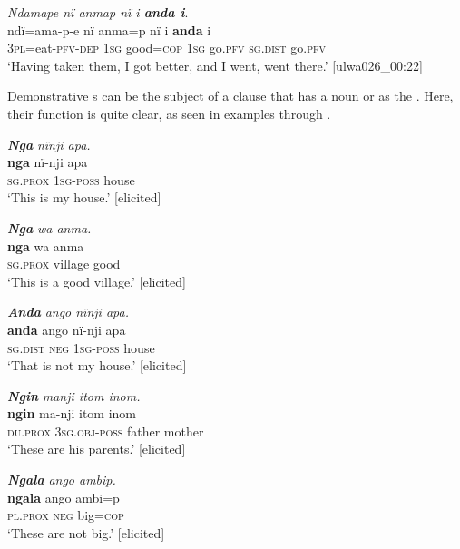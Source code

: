 \ea%
    \label{ex:det:144}
          \textit{Ndamape nï anmap nï i \textbf{anda i}}.\\
\gll ndï=ama-p-e    nï    anma=p  nï    i    \textbf{anda} i\\
    3\textsc{pl}=eat-\textsc{pfv-dep}  1\textsc{sg}  good=\textsc{cop}  \textsc{1sg}  go.\textsc{pfv}  \textsc{sg.dist}    go.\textsc{pfv}\\
\glt `Having taken them, I got better, and I went, went there.’ [ulwa026\_00:22]
\z

Demonstrative s can be the subject of a clause that has a noun or  as the . Here, their  function is quite clear, as seen in examples  through .

\ea%
    \label{ex:det:145}
          \textbf{\textit{Nga}} \textit{nïnji apa.}\\
\gll    \textbf{nga}    nï-nji    apa\\
    \textsc{sg.prox}  \textsc{1sg-poss}  house\\
\glt `This is my house.’ [elicited]
\z

\ea%
    \label{ex:det:146}
          \textbf{\textit{Nga}} \textit{wa anma.}\\
\gll    \textbf{nga}    wa    anma\\
    \textsc{sg.prox}  village  good\\
\glt `This is a good village.’ [elicited]
\z

\ea%
    \label{ex:det:147}
          \textbf{\textit{Anda}} \textit{ango nïnji apa.}\\
\gll    \textbf{anda}    ango  nï-nji    apa\\
    \textsc{sg.dist}  \textsc{neg}  \textsc{1sg-poss}  house\\
\glt `That is not my house.’ [elicited]
\z

\ea%
    \label{ex:det:148}
          \textbf{\textit{Ngin}} \textit{manji itom inom.}\\
\gll    \textbf{ngin}    ma-nji      itom  inom\\
    \textsc{du.prox}  \textsc{3sg.obj-poss}  father  mother\\
\glt `These are his parents.’ [elicited]
\z

\ea%
    \label{ex:det:149}
          \textbf{\textit{Ngala}} \textit{ango ambip.}\\
\gll    \textbf{ngala}    ango  ambi=p\\
    \textsc{pl.prox}  \textsc{neg}  big=\textsc{cop}\\
\glt `These are not big.’ [elicited]
\z

